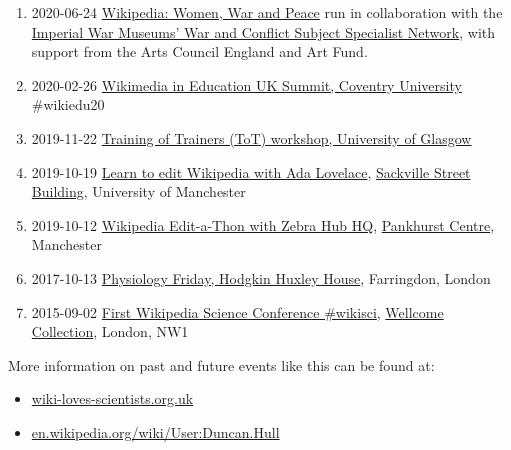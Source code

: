 \documentclass[
  12pt,
]{book}
\providecommand{\tightlist}{%
  \setlength{\itemsep}{0pt}\setlength{\parskip}{0pt}}
\begin{document}
\begin{enumerate}
\def\labelenumi{\arabic{enumi}.}
\tightlist
\item
  2020-06-24 \href{https://en.wikipedia.org/wiki/Wikipedia:Meetup/Women_in_War_and_Peace}{Wikipedia: Women, War and Peace} run in collaboration with the \href{https://www.iwm.org.uk/partnerships/subject-specialist-network}{Imperial War Museums' War and Conflict Subject Specialist Network}, with support from the Arts Council England and Art Fund.
\item
  2020-02-26 \href{https://wikiedusummit.coventry.domains}{Wikimedia in Education UK Summit, Coventry University} \#wikiedu20
\item
  2019-11-22 \href{https://duncan.hull.name/2019/12/10/glasgow/}{Training of Trainers (ToT) workshop, University of Glasgow}
\item
  2019-10-19 \href{https://wiki-loves-scientists.org.uk/2019/10/09/learn-to-edit-wikipedia-thurs-17th-october-university-of-manchester-all-welcome/}{Learn to edit Wikipedia with Ada Lovelace}, \href{https://en.wikipedia.org/wiki/Sackville_Street_Building}{Sackville Street Building}, University of Manchester \citep{findingada2019}
\item
  2019-10-12 \href{https://www.eventbrite.com/e/global-wikipedia-edit-a-thon-wikieditathon-2019-manchester-and-london-2019-zebra-hub-hq-the-tickets-48601581639}{Wikipedia Edit-a-Thon with Zebra Hub HQ}, \href{https://en.wikipedia.org/wiki/Pankhurst_Centre}{Pankhurst Centre}, Manchester
\item
  2017-10-13 \href{https://wiki-loves-scientists.org.uk/2017/10/27/mirror-mirror-on-the-wall-who-is-the-most-viewed-of-them-all/}{Physiology Friday, Hodgkin Huxley House}, Farringdon, London \citep{goodbadugly}
\item
  2015-09-02 \href{https://wikimedia.org.uk/wiki/Wikipedia_Science_Conference}{First Wikipedia Science Conference \#wikisci}, \href{https://en.wikipedia.org/wiki/Wellcome_Collection}{Wellcome Collection}, London, NW1 \citep{troubled, Hodson2015}
\end{enumerate}

More information on past and future events like this can be found at:

\begin{itemize}
\tightlist
\item
  \href{https://wiki-loves-scientists.org.uk/}{wiki-loves-scientists.org.uk}
\item
  \href{https://en.wikipedia.org/wiki/User:Duncan.Hull}{en.wikipedia.org/wiki/User:Duncan.Hull}
\end{itemize}
\end{document}

